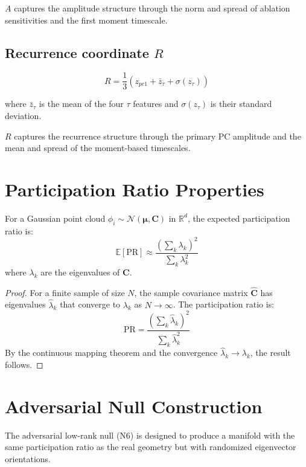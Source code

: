 \documentclass[10pt]{article}
\begin{document}
$A$ captures the amplitude structure through the norm and spread of ablation sensitivities and the first moment timescale.

\subsection{Recurrence coordinate $R$}

\[
R = \frac{1}{3} \left( z_{pc1} + \bar{z}_{\tau} + \sigma(z_{\tau}) \right)
\]

where $\bar{z}_{\tau}$ is the mean of the four $\tau$ features and $\sigma(z_{\tau})$ is their standard deviation.

$R$ captures the recurrence structure through the primary PC amplitude and the mean and spread of the moment-based timescales.

\section{Participation Ratio Properties}
\label{sec:appendix_pr}

\begin{theorem}
For a Gaussian point cloud $\phi_i \sim \mathcal{N}(\boldsymbol{\mu}, \mathbf{C})$ in $\mathbb{R}^d$, the expected participation ratio is:
\[
\mathbb{E}[\text{PR}] \approx \frac{(\sum_k \lambda_k)^2}{\sum_k \lambda_k^2}
\]
where $\lambda_k$ are the eigenvalues of $\mathbf{C}$.
\end{theorem}

\begin{proof}
For a finite sample of size $N$, the sample covariance matrix $\hat{\mathbf{C}}$ has eigenvalues $\hat{\lambda}_k$ that converge to $\lambda_k$ as $N \to \infty$. The participation ratio is:
\[
\text{PR} = \frac{(\sum_k \hat{\lambda}_k)^2}{\sum_k \hat{\lambda}_k^2}
\]
By the continuous mapping theorem and the convergence $\hat{\lambda}_k \to \lambda_k$, the result follows.
\end{proof}

\section{Adversarial Null Construction}
\label{sec:appendix_adversarial}

The adversarial low-rank null (N6) is designed to produce a manifold with the same participation ratio as the real geometry but with randomized eigenvector orientations.
\end{document}
